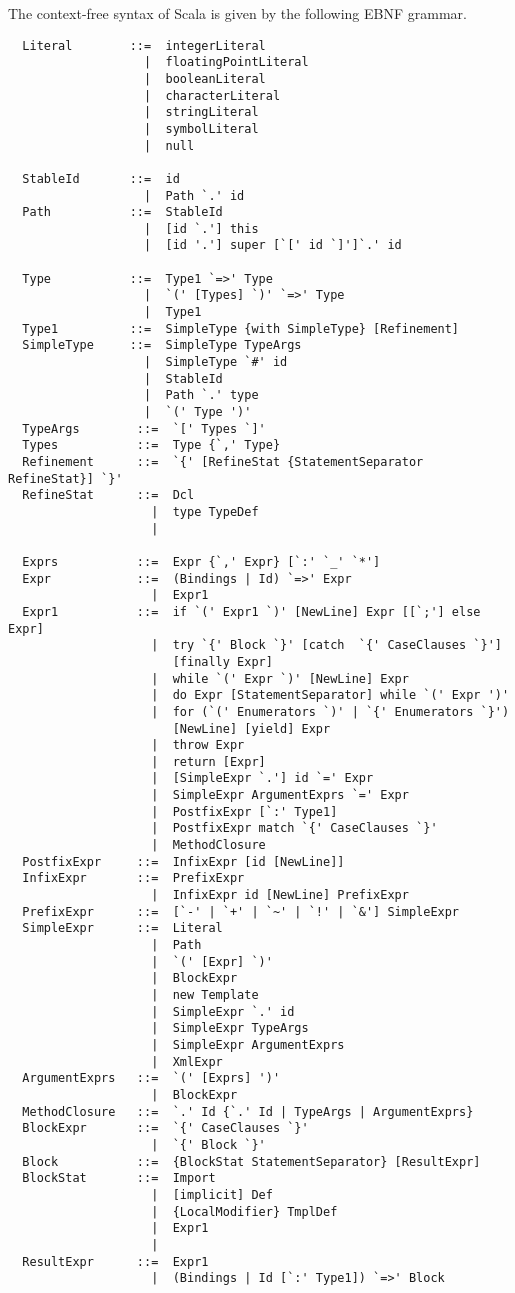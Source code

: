 The context-free syntax of Scala is given by the following EBNF
grammar.

\begin{lstlisting}
  Literal        ::=  integerLiteral
                   |  floatingPointLiteral
                   |  booleanLiteral
                   |  characterLiteral
                   |  stringLiteral
                   |  symbolLiteral
                   |  null

  StableId       ::=  id
                   |  Path `.' id
  Path           ::=  StableId
                   |  [id `.'] this
                   |  [id '.'] super [`[' id `]']`.' id

  Type           ::=  Type1 `=>' Type
                   |  `(' [Types] `)' `=>' Type
                   |  Type1
  Type1          ::=  SimpleType {with SimpleType} [Refinement]
  SimpleType     ::=  SimpleType TypeArgs
                   |  SimpleType `#' id
                   |  StableId
                   |  Path `.' type
                   |  `(' Type ')'
  TypeArgs        ::=  `[' Types `]'
  Types           ::=  Type {`,' Type}
  Refinement      ::=  `{' [RefineStat {StatementSeparator RefineStat}] `}'
  RefineStat      ::=  Dcl
                    |  type TypeDef
                    |

  Exprs           ::=  Expr {`,' Expr} [`:' `_' `*']
  Expr            ::=  (Bindings | Id) `=>' Expr
                    |  Expr1
  Expr1           ::=  if `(' Expr1 `)' [NewLine] Expr [[`;'] else Expr]
                    |  try `{' Block `}' [catch  `{' CaseClauses `}'] 
                       [finally Expr]
                    |  while `(' Expr `)' [NewLine] Expr
                    |  do Expr [StatementSeparator] while `(' Expr ')'
                    |  for (`(' Enumerators `)' | `{' Enumerators `}') 
                       [NewLine] [yield] Expr
                    |  throw Expr
                    |  return [Expr]
                    |  [SimpleExpr `.'] id `=' Expr
                    |  SimpleExpr ArgumentExprs `=' Expr
                    |  PostfixExpr [`:' Type1]
                    |  PostfixExpr match `{' CaseClauses `}'
                    |  MethodClosure
  PostfixExpr     ::=  InfixExpr [id [NewLine]]
  InfixExpr       ::=  PrefixExpr
                    |  InfixExpr id [NewLine] PrefixExpr
  PrefixExpr      ::=  [`-' | `+' | `~' | `!' | `&'] SimpleExpr 
  SimpleExpr      ::=  Literal
                    |  Path
                    |  `(' [Expr] `)'
                    |  BlockExpr
                    |  new Template 
                    |  SimpleExpr `.' id 
                    |  SimpleExpr TypeArgs
                    |  SimpleExpr ArgumentExprs
                    |  XmlExpr
  ArgumentExprs   ::=  `(' [Exprs] ')'
                    |  BlockExpr
  MethodClosure   ::=  `.' Id {`.' Id | TypeArgs | ArgumentExprs}
  BlockExpr       ::=  `{' CaseClauses `}'
                    |  `{' Block `}'
  Block           ::=  {BlockStat StatementSeparator} [ResultExpr]
  BlockStat       ::=  Import
                    |  [implicit] Def
                    |  {LocalModifier} TmplDef
                    |  Expr1
                    |
  ResultExpr      ::=  Expr1
                    |  (Bindings | Id [`:' Type1]) `=>' Block


\end{lstlisting}
